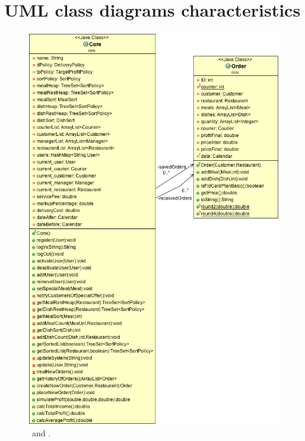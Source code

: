 \section{UML class diagrams characteristics} %
\label{sec:uml_class_diagrams_characteristics}
\begin{figure}
  \begin{center}
    \includegraphics[scale=0.57]{./img/CoreDiagram.png}
    \end{center}
  \caption{\umld \Core~and \Order.}
  \label{fig:core_order_uml}
\end{figure}
